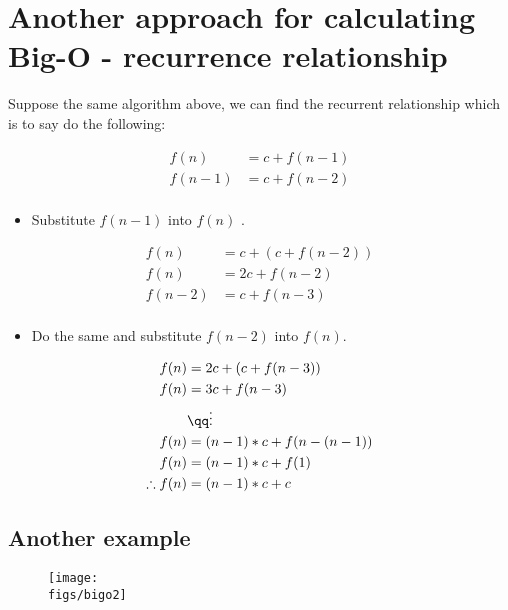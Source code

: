 \section{Another approach for calculating Big-O - recurrence relationship}
Suppose the same algorithm above, we can find the recurrent relationship which is to say do the following:
\begin{center}
   \begin{align*}
       f(n) &= c + f(n-1)\\ 
       f(n-1) &= c + f(n-2)\\ 
   \end{align*}
   \begin{itemize}
       \item Substitute $f(n-1)$ into $f(n)$ .
   \end{itemize}
   \begin{align*}
        f(n) &= c + (c + f(n-2)) \\ 
        f(n) &= 2c + f(n-2) \\ 
        f(n-2) &= c + f(n-3) \\ 
   \end{align*}
   \begin{itemize}
       \item Do the same and substitute $f(n-2)$ into $f(n)$. 
   \end{itemize}
   \begin{align*}
        f(n) &= 2c + (c + f(n-3)) \\ 
        f(n) &= 3c + f(n-3) \\  
        &\qq \vdots \\ 
        f(n) &= (n-1) * c + f(n-(n-1)) \\ 
        f(n) &= (n-1) * c + f(1) \\ 
        \therefore f(n) &= (n-1) * c + c \\ 
   \end{align*}
\end{center}

\subsection{Another example}
\begin{figure}[H]
    \centering
    \texttt{[image: \\figs/bigo2]}
\end{figure}


